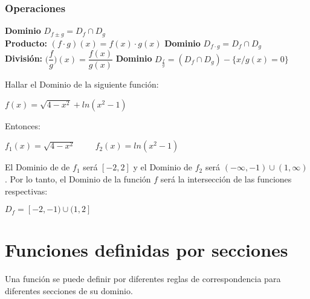 \documentclass[12pt,a4paper]{book}
\newcommand*\ruleline[1]{\par\noindent\raisebox{.8ex}{\makebox[\linewidth]{\hrulefill\hspace{1ex}\raisebox{-.8ex}{#1}\hspace{1ex}\hrulefill}}}
\begin{document}
{\subsubsection{Operaciones}
\begin{framed}\noindent
{} \hspace{2cm} \textbf{Dominio} $D_{f \pm g} =  D_f \cap D_g$ \\${ }$\\
\textbf{Producto: } $(f \cdot g)(x) = f(x) \cdot g(x)$ \hspace{1.75cm}\textbf{Dominio} $D_{f \cdot g} =  D_f \cap D_g$ \\${ }$ \\
\textbf{División: } $\bigg( \dfrac{f}{g} \bigg)(x) = \dfrac{f(x)}{g(x)}$ \hspace{3cm} \textbf{Dominio} $D_{\frac{f}{g}} =  (D_f \cap D_g) - \lbrace x / g(x)=0 \rbrace$
\end{framed}

\ruleline{\textbf{Ejemplos}}
 Hallar el Dominio de la siguiente función:
\begin{center}
$f(x)= \sqrt{4-x^2} + ln(x^2- 1) $
\end{center}
Entonces:
\begin{center}
$f_1 (x)= \sqrt{4-x^2} \hspace{1cm} f_2 (x) = ln(x^2 - 1) $
\end{center}
El Dominio de de $f_1$ será $[-2,2]$ y el Dominio de $f_2$ será $(-\infty,-1) \cup (1,\infty)$. Por lo tanto, el Dominio de la función $f$ será la intersección de las funciones respectivas:

\begin{center}
$D_f = [-2,-1) \cup (1,2]$

\end{center}


\section{Funciones definidas por secciones}
Una función se puede definir por diferentes reglas de correspondencia para diferentes secciones de su dominio.

\ruleline{\textbf{Ejemplos}}

\begin{center}
\begin{centering}
\end{centering}
\end{center}
}
\end{document}
